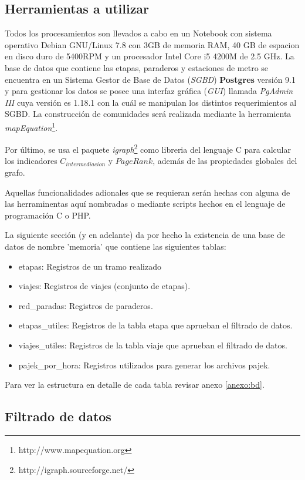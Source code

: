 \documentclass[12pt]{article}
\begin{document}
	\subsection{Herramientas a utilizar}
	
	Todos los procesamientos son llevados a cabo en un Notebook con sistema operativo Debian GNU/Linux 7.8 con 3GB de memoria RAM, 40 GB de espacion en disco duro de 5400RPM y un procesador Intel Core i5 4200M de 2.5 GHz.
	La base de datos que contiene las etapas, paraderos y estaciones de metro se encuentra en un Sistema Gestor de Base de Datos (\textit{SGBD}) \textbf{Postgres} versión 9.1 y para gestionar los datos se posee una interfaz gráfica (\textit{GUI}) llamada \textit{PgAdmin III} cuya versión es 1.18.1 con la cuál se manipulan los distintos requerimientos al SGBD. 
	La construcción de comunidades será realizada mediante la herramienta \textit{mapEquation}\footnote{http://www.mapequation.org}.
	
	Por último, se usa el paquete \textit{igraph}\footnote{http://igraph.sourceforge.net/} como libreria del lenguaje C para calcular los indicadores $C_{intermediacion}$ y $PageRank$, además de las propiedades globales del grafo.
	 
	Aquellas funcionalidades adionales que se requieran serán hechas con alguna de las herraminentas aquí nombradas o mediante scripts hechos en el lenguaje de programación C o PHP.
	
	La siguiente sección (y en adelante) da por hecho la existencia de una base de datos de nombre 'memoria' que contiene las siguientes tablas:

	\begin{itemize}
		\item etapas:	 Registros de un tramo realizado
		\item viajes:	 Registros de viajes (conjunto de etapas).
		\item red\_paradas:	 Registros de paraderos.
		\item etapas\_utiles: Registros de la tabla etapa que aprueban el filtrado de datos.
		\item viajes\_utiles: Registros de la tabla viaje que aprueban el filtrado de datos.
		\item pajek\_por\_hora: Registros utilizados para generar los archivos pajek.
	\end{itemize}
	
	Para ver la estructura en detalle de cada tabla revisar anexo \ref{anexo:bd}.
	
	\subsection{Filtrado de datos}
	
\end{document}
